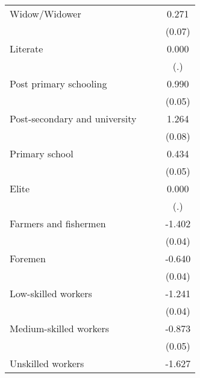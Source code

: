 {\begin{tabular}{l*{3}{c}}
Widow/Widower       &                     &                     &       0.271\sym{***}\\
                    &                     &                     &      (0.07)         \\
Literate            &                     &                     &       0.000         \\
                    &                     &                     &         (.)         \\
Post primary schooling&                     &                     &       0.990\sym{***}\\
                    &                     &                     &      (0.05)         \\
Post-secondary and university&                     &                     &       1.264\sym{***}\\
                    &                     &                     &      (0.08)         \\
Primary school      &                     &                     &       0.434\sym{***}\\
                    &                     &                     &      (0.05)         \\
Elite               &                     &                     &       0.000         \\
                    &                     &                     &         (.)         \\
Farmers and fishermen&                     &                     &      -1.402\sym{***}\\
                    &                     &                     &      (0.04)         \\
Foremen             &                     &                     &      -0.640\sym{***}\\
                    &                     &                     &      (0.04)         \\
Low-skilled workers &                     &                     &      -1.241\sym{***}\\
                    &                     &                     &      (0.04)         \\
Medium-skilled workers&                     &                     &      -0.873\sym{***}\\
                    &                     &                     &      (0.05)         \\
Unskilled workers   &                     &                     &      -1.627\sym{***}\\

\end{tabular}}
